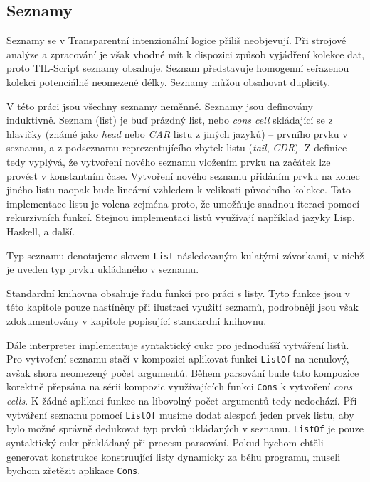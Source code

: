 \subsection{Seznamy}

Seznamy se v Transparentní intenzionální logice příliš neobjevují. Při strojové analýze a
zpracování je však vhodné mít k dispozici způsob vyjádření kolekce dat, proto TIL-Script seznamy
obsahuje. Seznam představuje homogenní seřazenou kolekci potenciálně neomezené délky. Seznamy můžou
obsahovat duplicity.

V této práci jsou všechny seznamy neměnné. Seznamy jsou definovány induktivně. Seznam (list) je buď
prázdný list, nebo \textit{cons cell} skládající se z hlavičky (známé jako \textit{head} nebo
\textit{CAR} listu z jiných jazyků) -- prvního prvku v seznamu, a z podseznamu reprezentujícího
zbytek listu (\textit{tail}, \textit{CDR}). Z definice tedy vyplývá, že vytvoření nového seznamu
vložením prvku na začátek lze provést v konstantním čase. Vytvoření nového seznamu přidáním prvku
na konec jiného listu naopak bude lineární vzhledem k velikosti původního kolekce. Tato
implementace listu je volena zejména proto, že umožňuje snadnou iteraci pomocí rekurzivních funkcí.
Stejnou implementaci listů využívají například jazyky Lisp, Haskell, a další.

Typ seznamu denotujeme slovem \lstinline{List} následovaným kulatými závorkami, v nichž je uveden
typ prvku ukládaného v seznamu.

Standardní knihovna obsahuje řadu funkcí pro práci s listy. Tyto funkce jsou v této kapitole pouze
nastíněny při ilustraci využití seznamů, podrobněji jsou však zdokumentovány v kapitole popisující
standardní knihovnu.

Dále interpreter implementuje syntaktický cukr pro jednodušší vytváření listů. Pro vytvoření
seznamu stačí v kompozici aplikovat funkci \lstinline{ListOf} na nenulový, avšak shora neomezený
počet argumentů. Během parsování bude tato kompozice korektně přepsána na sérii kompozic
využívajících funkci \lstinline{Cons} k vytvoření \textit{cons cells}. K žádné aplikaci funkce
na libovolný počet argumentů tedy nedochází. Při vytváření seznamu pomocí \lstinline{ListOf} musíme
dodat alespoň jeden prvek listu, aby bylo možné správně dedukovat typ prvků ukládaných v seznamu.
\lstinline{ListOf} je pouze syntaktický cukr překládaný při procesu parsování. Pokud bychom chtěli
generovat konstrukce konstruující listy dynamicky za běhu programu, museli bychom zřetězit aplikace
\lstinline{Cons}.

